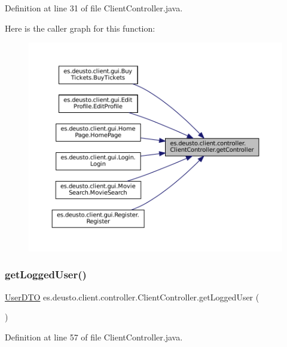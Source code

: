 Definition at line 31 of file Client\+Controller.\+java.

Here is the caller graph for this function\+:
\nopagebreak
\begin{figure}[H]
\begin{center}
\leavevmode
\includegraphics[width=350pt]{classes_1_1deusto_1_1client_1_1controller_1_1_client_controller_aa76786bb097da98592adb6aeefa8d996_icgraph}
\end{center}
\end{figure}
\mbox{\label{classes_1_1deusto_1_1client_1_1controller_1_1_client_controller_ac9d06db0017e2f06d06e8669398118f4}} 
\subsubsection{\texorpdfstring{getLoggedUser()}{getLoggedUser()}}
{\footnotesize\ttfamily \mbox{\hyperlink{classes_1_1deusto_1_1server_1_1data_1_1_user_d_t_o}{User\+D\+TO}} es.\+deusto.\+client.\+controller.\+Client\+Controller.\+get\+Logged\+User (\begin{DoxyParamCaption}{ }\end{DoxyParamCaption})}



Definition at line 57 of file Client\+Controller.\+java.

